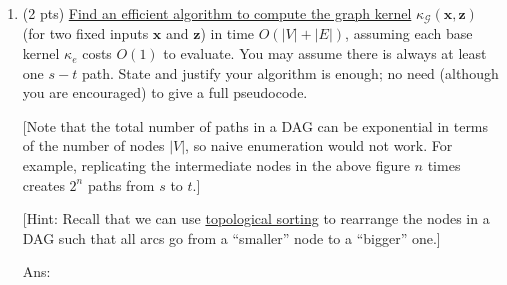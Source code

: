 \documentclass[10pt]{article}
\newcommand{\xv}{\mathbf{x}}
\newcommand{\zv}{\mathbf{z}}
\newcommand{\ans}[1]{{\color{blue}\textsf{Ans}: #1}}
\begin{document}
\begin{exercise}
\begin{enumerate}
			\begin{center}
			\end{center}

			\ans{\vskip3cm}
			
			\item (2 pts) \uline{Find an efficient algorithm to compute the graph kernel} $\kappa_{\mathcal{G}}(\xv, \zv)$ (for two fixed inputs $\xv$ and $\zv$) in time $O(|V| + |E|)$, assuming each base kernel $\kappa_e$ costs $O(1)$ to evaluate. You may assume there is always at least one $s-t$ path. State and justify your algorithm is enough; no need (although you are encouraged) to give a full pseudocode. 
			
			[Note that the total number of paths in a DAG can be exponential in terms of the number of nodes $|V|$, so naive enumeration would not work. For example, replicating the intermediate nodes in the above figure $n$ times creates $2^n$ paths from $s$ to $t$.]
			
			[Hint: Recall that we can use \href{https://en.wikipedia.org/wiki/Topological_sorting}{topological sorting} to rearrange the nodes in a DAG such that all arcs go from a ``smaller'' node to a ``bigger'' one.]
			
			\ans{\vskip5cm}
		\end{enumerate}
	\end{exercise}
\end{document}
